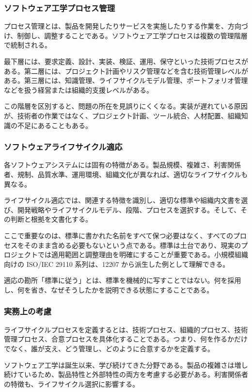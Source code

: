 \subsubsection{ソフトウェア工学プロセス管理}
プロセス管理とは、製品を開発したりサービスを実施したりする作業を、方向づけ、制御し、調整することである。ソフトウェア工学プロセスは複数の管理階層で統制される。

最下層には、要求定義、設計、実装、検証、運用、保守といった技術プロセスがある。第二層には、プロジェクト計画やリスク管理などを含む技術管理レベルがある。第三層には、知識管理、ライフサイクルモデル管理、ポートフォリオ管理などを扱う経営または組織的支援レベルがある。

この階層を区別すると、問題の所在を見誤りにくくなる。実装が遅れている原因が、技術者の作業ではなく、プロジェクト計画、ツール統合、人材配置、組織知識の不足にあることもある。

\subsubsection{ソフトウェアライフサイクル適応}
各ソフトウェアシステムには固有の特徴がある。製品規模、複雑さ、利害関係者、規制、品質水準、運用環境、組織文化が異なれば、適切なライフサイクルも異なる。

ライフサイクル適応では、関連する特徴を識別し、適切な標準や組織内文書を選び、開発戦略やライフサイクルモデル、段階、プロセスを選択する。そして、その判断と根拠を文書化する。

ここで重要なのは、標準に書かれた名前をすべて保つ必要はなく、すべてのプロセスをそのまま含める必要もないという点である。標準は土台であり、現実のプロジェクトでは適用範囲と調整理由を明確にすることが重要である。小規模組織向けの ISO/IEC 29110 系列は、12207 から派生した例として理解できる。

\begin{pointbox}{適応の勘所}「標準に従う」とは、標準を機械的に写すことではない。何を採用し、何を省き、なぜそうしたかを説明できる状態にすることである。\end{pointbox}
\subsubsection{実務上の考慮}
ライフサイクルプロセスを定義するとは、技術プロセス、組織的プロセス、技術管理プロセス、合意プロセスを具体化することである。つまり、何を作るかだけでなく、誰が支え、どう管理し、どのように合意するかを定義する。

ソフトウェア工学は誕生以来、学び続けてきた分野である。製品の複雑さは増し続けているため、製品特性と外部特性の両方を考慮する必要がある。利害関係者の特徴も、ライフサイクル選択に影響する。

